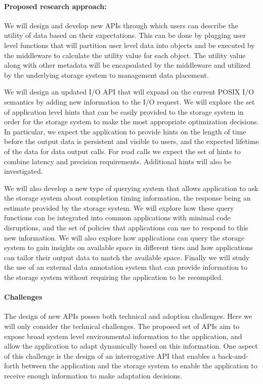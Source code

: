 \paragraph{Proposed research approach:} 
We will design and develop new APIs through which users can describe the utility of data
based on their expectations. This can be done by plugging user level functions that will
partition user level data into objects and be executed by the middleware to calculate the 
utility value for each object. The utility value along with other metadata will be encapsulated
by the middleware and utilized by the underlying storage system to management data placement.

We will design an updated I/O API that will expand on the current POSIX I/O
semantics by adding new information to the I/O request. We will explore the
set of application level hints that can be easily provided to the storage
system in order for the storage system to make the most appropriate
optimization decisions. In particular, we expect the application to provide
hints on the length of time before the output data is persistent and
visible to users, and the expected lifetime of the data for data output
calls. For read calls we expect the set of hints to combine latency and
precision requirements. Additional hints will also be investigated. 

We will also develop a new type of querying system that allows application
to ask the storage system about completion timing information, the response
being an estimate provided by the storage system. We will explore how these
query functions can be integrated into common applications with minimal code
disruptions, and the set of policies that applications can use to respond to
this new information. We will also explore how applications can query the
storage system to gain insights on available space in different tiers and
how applications can tailor their output data to match the available space. 
Finally we will study the use of an external data annotation system that can
provide information to the storage system without requiring the application
to be recompiled. 

\paragraph{Challenges}
The design of new APIs posses both technical and adoption challenges. Here
we will only consider the technical challenges. The proposed set of APIs aim
to expose broad system level environmental information to the application,
and allow the application to adapt dynamically based on this information.
One aspect of this challenge is the design of an interrogative API that
enables a back-and-forth between the application and the storage system to
enable the application to receive enough information to make adaptation
decisions. 



